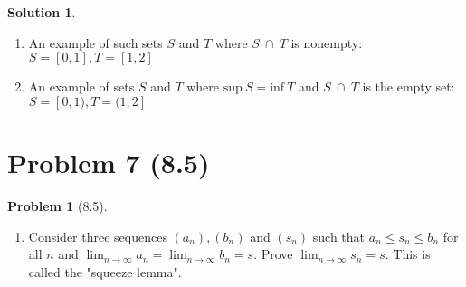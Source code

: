 \documentclass[12pt]{article}
\theoremstyle{definition} %
\newtheorem{solution}{Solution}
\newtheorem{problem}{Problem}
\theoremstyle{plain} %
\begin{document}
\begin{solution}
\begin{enumerate}
        
        \item An example of such sets $S$ and $T$ where $S \ \cap \ T$ is nonempty: $S=[0,1], T=[1,2]$
        
        \item An example of sets $S$ and $T$ where $\text{sup}\ S = \text{inf}\ T$ and $S \ \cap \ T$ is the empty set: $S=[0,1), T=(1,2]$
    \end{enumerate}
    
\end{solution}

\section*{Problem 7 (8.5)}
\begin{problem}[8.5]
 \begin{enumerate}
    \item Consider three sequences $(a_{n}), (b_n)$ and $(s_{n})$ such that $a_{n}\leq s_{n}\leq b_{n}$ for all $n$ and $\lim_{ n \to \infty }a_{n}=\lim_{ n \to \infty }b_{n}=s$. Prove $\lim_{ n \to \infty }s_{n}=s$. This is called the "squeeze lemma".
\end{enumerate}
  
\end{problem}
\end{document}
